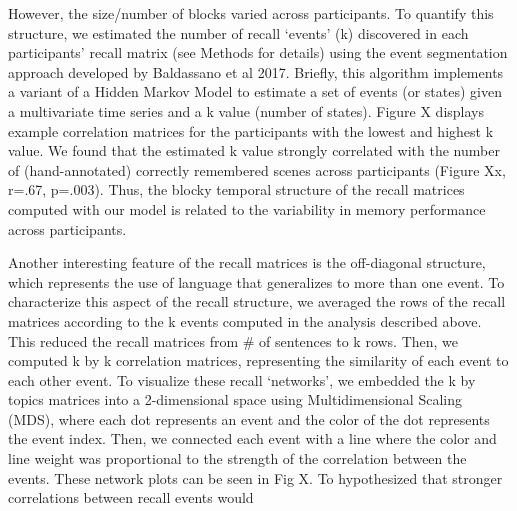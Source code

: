 \documentclass[a4paper,man,natbib,floatsintext]{apa6}
\begin{document}
 However, the size/number of blocks varied across participants.  To quantify this structure, we estimated the number of recall `events' (k)  discovered in each participants' recall matrix (see Methods for details) using the event segmentation approach developed by Baldassano et al 2017.  Briefly, this algorithm implements a variant of a Hidden Markov Model to estimate a set of events (or states) given a multivariate time series and a k value (number of states). Figure X displays example correlation matrices for the participants with the lowest and highest k value.  We found that the estimated k value strongly correlated with the number of (hand-annotated) correctly remembered scenes across participants (Figure Xx, r=.67, p=.003). Thus, the blocky temporal structure of the recall matrices computed with our model is related to the variability in memory performance across participants.

Another interesting feature of the recall matrices is the off-diagonal structure, which represents the use of language that generalizes to more than one event. To characterize this aspect of the recall structure, we averaged the rows of the recall matrices according to the k events computed in the analysis described above.  This reduced the recall matrices from \# of sentences to k rows. Then, we computed k by k correlation matrices, representing the similarity of each event to each other event. To visualize these recall `networks', we embedded the k by topics matrices into a 2-dimensional space using Multidimensional Scaling (MDS), where each dot represents an event and the color of the dot represents the event index.  Then, we connected each event with a line where the color and line weight was proportional to the strength of the correlation between the events. These network plots can be seen in Fig X. To hypothesized that stronger correlations between recall events would
\end{document}

